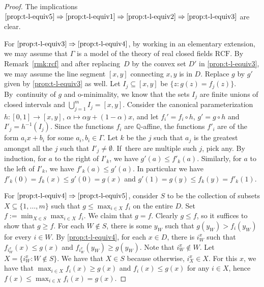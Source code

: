 \documentclass[JEP,XML,SOM,Unicode,ThmDefs,NoEqCountersInSection,published]{cedram}
\let\oldimplies\implies
\renewcommand\implies{\mathchoice{\oldimplies}{\Rightarrow}{\Rightarrow}{\Rightarrow}}
\newcommand{\Q}{\mathbb Q}
\theoremstyle{plain}
\theoremstyle{definition}
\begin{document}
\begin{proof}
The implications $\eqref{prop:t-l-equiv5}\implies \eqref{prop:t-l-equiv1}\implies \eqref{prop:t-l-equiv2}\implies \eqref{prop:t-l-equiv3}$ are clear.

For $\eqref{prop:t-l-equiv3}\implies \eqref{prop:t-l-equiv4}$, by working in an elementary extension, we may assume that $\Gamma$ is a model of the theory of real closed fields $\mathrm{RCF}$. By Remark~\ref{rmk:rcf} and after replacing~$D$ by the convex set $D'$ in \eqref{prop:t-l-equiv3}, we may assume the line segment $[x,y]$ connecting $x,y$ is in $D$. Replace $g$ by $g'$ given by \eqref{prop:t-l-equiv3} as well. Let $I_j\subseteq [x,y]$ be $\{z: g(z)=f_j(z)\}$. By~continuity of $g$ and o-minimality, we know that the sets $I_j$ are finite unions of closed intervals and $\bigcup^m_{j=1} I_j=[x,y]$. Consider the canonical parameterization $h:[0,1]\to [x,y]$, $\alpha\mapsto \alpha y+(1-\alpha)x$, and let $f_i'=f_i\circ h$, $g'=g\circ h$ and $I'_j=h^{-1}(I_j)$. Since the functions $f_i$ are $\Q$-affine, the functions $f'_i$ are of the form $a_ix+b_i$ for some $a_i,b_i\in \Gamma$. Let $k$ be the $j$ such that $a_j$ is the greatest amongst all the $j$ such that $I'_j\neq \emptyset$. If~there are multiple such $j$, pick any. By induction, for $a$ to the right of $I'_k$, we have $g'(a)\leq f'_k(a)$. Similarly, for $a$ to the left of $I'_k$, we have $f'_k(a)\leq g'(a)$. In particular we have $f'_k(0)=f_k(x)\leq g'(0)=g(x)$ and $g'(1)=g(y)\leq f_k(y)=f'_k(1)$.

For $\eqref{prop:t-l-equiv4}\implies \eqref{prop:t-l-equiv5}$, consider $S$ to be the collection of subsets $X\subseteq \{1,\ldots,m\}$ such that $g\leq \max_{i\in X} f_i$ on the entire $D$.
Set $f:=\min_{X\in S}\max_{i\in X} f_i$.
We claim that $g= f$. Clearly $g\leq f$, so it suffices to show that $g\geq f$. For each $W\notin S$, there is some $y_W$ such that $g(y_W)>f_i(y_W)$ for
every $i \in W$. By \eqref{prop:t-l-equiv4}, for each $x\in D$, there is $i^x_{W}$ such that $f_{i^x_{W}}(x)\leq g(x)$ and $f_{i^x_W}(y_W)\geq g(y_W)$. Note that $i^x_W\notin W$. Let $X=\{i^x_W:W\notin S\}$. We have that $X\in S$ because otherwise, $i^x_X\in X$. For this $x$, we have that $\max_{i\in X} f_i(x)\geq g(x)$ and $f_i(x)\leq g(x)$ for any $i\in X$, hence $f(x)\leq \max_{i\in X} f_i(x)=g(x)$.
\end{proof}
\end{document}
